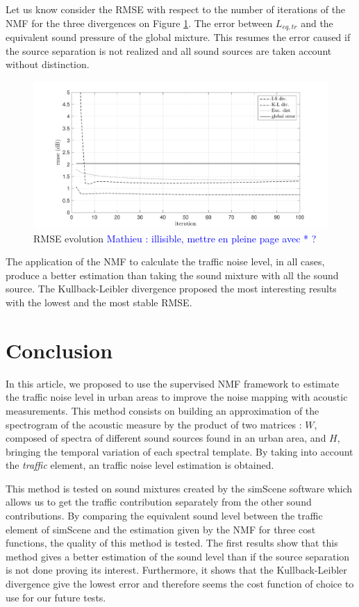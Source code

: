 \documentclass{article}
\newcommand{\ml}[1]{\textcolor{blue}{ Mathieu : #1}}
\begin{document}
\begin{sloppy}
Let us know consider the RMSE with respect to the number of iterations of the NMF for the three divergences on Figure \ref{fig:rmse}. The error between $L_{eq,tr}$ and the equivalent sound pressure of the global mixture. This resumes the error caused if the source separation is not realized and all sound sources are taken account without distinction.

\begin{figure}[btp]
\centering
\includegraphics[width=\textwidth]{images/comparaison_RMSE_nbCl3.pdf}
\caption{RMSE evolution \ml{illisible, mettre en pleine page avec * ?}}
\label{fig:rmse}
\end{figure}

The application of the NMF to calculate the traffic noise level, in all cases, produce a better estimation than taking the sound mixture with all the sound source. The Kullback-Leibler divergence proposed the most interesting results with the lowest and the most stable RMSE.


\section{Conclusion}

In this article, we proposed to use the supervised NMF framework to estimate the traffic noise level in urban areas to improve the noise mapping with acoustic measurements. This method consists on building an approximation of the spectrogram of the acoustic measure by the product of two matrices : $W$, composed of spectra of different sound sources found in an urban area, and $H$,  bringing the temporal variation of each spectral template. By taking into account the \textit{traffic} element, an traffic noise level estimation is obtained. 

This method is tested on sound mixtures created by the simScene software which allows us to get the traffic contribution separately from the other sound contributions. By comparing the equivalent sound level between the traffic element of simScene and the estimation given by the NMF for three cost functions, the quality of this method is tested. The first results show that this method gives a better estimation of the sound level than if the source separation is not done proving its interest. Furthermore, it shows that the Kullback-Leibler divergence give the lowest error and therefore seems the cost function of choice to use for our future tests.



\end{sloppy}
\end{document}
